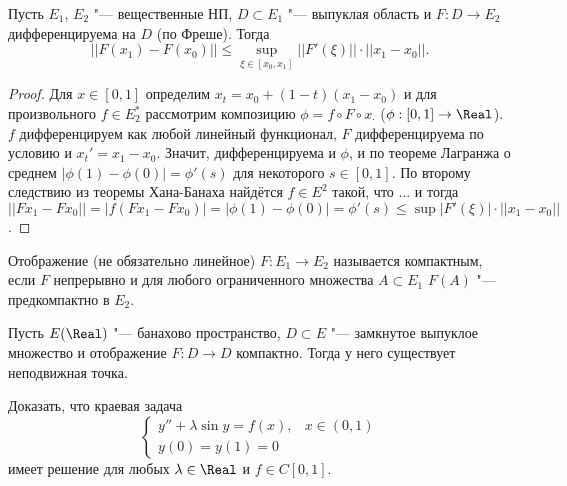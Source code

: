 \documentclass[main]{subfiles}
\begin{document}
\begin{theorem}
  Пусть \( E_1 \), \( E_2 \) "--- вещественные НП,
  \( D \subset E_1 \) "--- выпуклая область
  и \( F : D \to E_2 \) дифференцируема на \( D \)
  (по Фреше).
  Тогда
  \[
    ||F(x_1) - F(x_0)|| \le \sup_{\xi \in [x_0, x_1]} ||F'(\xi)|| \cdot ||x_1 - x_0||.
  \]
\end{theorem}
\begin{proof}
  Для \( x \in [0, 1] \) определим \( x_t = x_0 + (1 - t) (x_1 - x_0) \) и
  для произвольного \( f \in E_2^* \) рассмотрим композицию
  \( \phi = f \circ F \circ x_\cdot \)
  (\( \phi : [0, 1] \to \Real \)).
  \( f \) дифференцируем как любой линейный функционал,
  \( F \) дифференцируема по условию
  и \( x_t' = x_1 - x_0 \).
  Значит, дифференцируема и \( \phi \),
  и по теореме Лагранжа о среднем
  \( |\phi(1) - \phi(0)| = \phi'(s) \)
  для некоторого \( s \in [0, 1] \).
  По второму следствию из теоремы Хана-Банаха
  найдётся \( f \in E^2 \) такой, что ...
  и тогда
  \( ||F x_1 - F x_0|| = |f(Fx_1 - F x_0)| =
  |\phi(1) - \phi(0)| = \phi'(s) \le
  \sup |F'(\xi)| \cdot ||x_1 - x_0|| \).
\end{proof}

\begin{definition}
  Отображение (не обязательно линейное)
  \( F : E_1 \to E_2 \)
  называется компактным, если
  \( F \) непрерывно и для любого ограниченного
  множества \( A \subset E_1 \)
  \( F(A) \) "--- предкомпактно в \( E_2 \).
\end{definition}

\begin{theorem}[Шаудера]
  Пусть \( E(\Real) \) "--- банахово пространство,
  \( D \subset E \) "--- замкнутое выпуклое множество
  и отображение \( F : D \to D \) компактно.
  Тогда у него существует неподвижная точка.
\end{theorem}

\begin{example}
  Доказать, что краевая задача
  \[
    \begin{cases}
      y'' + \lambda \sin y = f(x), & x \in (0, 1) \\
      y(0) = y(1) = 0
    \end{cases}
  \]
  имеет решение для любых \( \lambda \in \Real \)
  и \( f \in C[0, 1] \).
\end{example}
\end{document}
